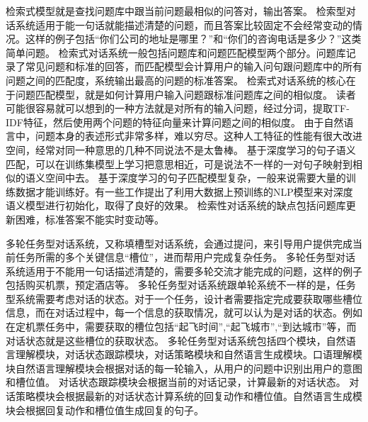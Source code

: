\documentclass[graybox,envcountchap,sectrefs]{svmono}
\begin{document}
检索式模型就是查找问题库中跟当前问题最相似的问答对，输出答案。
检索型对话系统适用于能一句话就能描述清楚的问题，而且答案比较固定不会经常变动的情况。这样的例子包括``你们公司的地址是哪里？''和``你们的咨询电话是多少？''这类简单问题。
检索式对话系统一般包括问题库和问题匹配模型两个部分。问题库记录了常见问题和标准的回答，而匹配模型会计算用户的输入问句跟问题库中的所有问题之间的匹配度，系统输出最高的问题的标准答案。
检索式对话系统的核心在于问题匹配模型，就是如何计算用户输入问题跟标准问题库之间的相似度。
读者可能很容易就可以想到的一种方法就是对所有的输入问题，经过分词，提取TF-IDF特征，然后使用两个问题的特征向量来计算问题之间的相似度。
由于自然语言中，问题本身的表述形式非常多样，难以穷尽。这种人工特征的性能有很大改进空间，经常对同一种意思的几种不同说法不是太鲁棒。
基于深度学习的句子语义匹配，可以在训练集模型上学习把意思相近，可是说法不一样的一对句子映射到相似的语义空间中去。
基于深度学习的句子匹配模型复杂，一般来说需要大量的训练数据才能训练好。有一些工作提出了利用大数据上预训练的NLP模型来对深度语义模型进行初始化，取得了良好的效果。
检索性对话系统的缺点包括问题库更新困难，标准答案不能实时变动等。

多轮任务型对话系统\cite{young2013pomdp}，又称填槽型对话系统，会通过提问，来引导用户提供完成当前任务所需的多个关键信息``槽位''，进而帮用户完成复杂任务。
多轮任务型对话系统适用于不能用一句话描述清楚的，需要多轮交流才能完成的问题，这样的例子包括购买机票，预定酒店等。
多轮任务型对话系统跟单轮系统不一样的是，任务型系统需要考虑对话的状态。对于一个任务，设计者需要指定完成要获取哪些槽位信息，而在对话过程中，每一个信息的获取情况，就可以认为是对话的状态。例如在定机票任务中，需要获取的槽位包括``起飞时间'',``起飞城市'',``到达城市''等，而对话状态就是这些槽位的获取状态。
多轮任务型对话系统包括四个模块，自然语言理解模块，对话状态跟踪模块，对话策略模块和自然语言生成模块。口语理解模块自然语言理解模块会根据对话的每一轮输入，从用户的问题中识别出用户的意图和槽位值。
对话状态跟踪模块会根据当前的对话记录，计算最新的对话状态。 对话策略模块会根据最新的对话状态计算系统的回复动作和槽位值。自然语言生成模块会根据回复动作和槽位值生成回复的句子。
\end{document}
